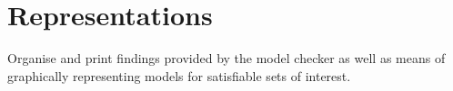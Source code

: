 \documentclass[a4paper, 11pt]{article} %
\begin{document}
\section{Representations}

Organise and print findings provided by the model checker as well as means of graphically representing models for satisfiable sets of interest.







%
\end{document}
